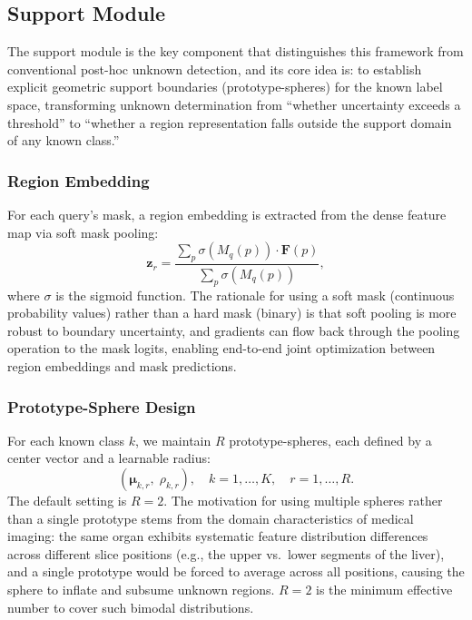 \documentclass[3p,twocolumn,authoryear]{elsarticle}
\newcommand{\bF}{\mathbf{F}}                              %
\newcommand{\bz}{\mathbf{z}}                              %
\newcommand{\bmu}{\boldsymbol{\mu}}                       %
\begin{document}
\subsection{Support Module}\label{sec:method:support}

The support module is the key component that distinguishes this framework from
conventional post-hoc unknown detection, and its core idea is:
to establish explicit geometric support boundaries (prototype-spheres) for the known
label space, transforming unknown determination from ``whether uncertainty exceeds a
threshold'' to ``whether a region representation falls outside the support domain of
any known class.''

\subsubsection{Region Embedding}\label{sec:method:support:embed}

For each query's mask, a region embedding is extracted from the dense feature map
via soft mask pooling:
\begin{equation}\label{eq:mask_pool}
  \bz_r = \frac{\sum_{p} \sigma\!\left(M_q(p)\right) \cdot \bF(p)}{\sum_{p} \sigma\!\left(M_q(p)\right)},
\end{equation}
where $\sigma$ is the sigmoid function.
The rationale for using a soft mask (continuous probability values) rather than a
hard mask (binary) is that soft pooling is more robust to boundary uncertainty,
and gradients can flow back through the pooling operation to the mask logits,
enabling end-to-end joint optimization between region embeddings and mask predictions.

\subsubsection{Prototype-Sphere Design}\label{sec:method:support:sphere}

For each known class $k$, we maintain $R$ prototype-spheres, each defined by a
center vector and a learnable radius:
\begin{equation}\label{eq:proto_sphere}
  (\bmu_{k,r},\; \rho_{k,r}), \quad k = 1, \ldots, K, \quad r = 1, \ldots, R.
\end{equation}
The default setting is $R=2$.
The motivation for using multiple spheres rather than a single prototype stems from
the domain characteristics of medical imaging: the same organ exhibits systematic
feature distribution differences across different slice positions (e.g., the upper
vs.\ lower segments of the liver), and a single prototype would be forced to average
across all positions, causing the sphere to inflate and subsume unknown regions.
$R=2$ is the minimum effective number to cover such bimodal distributions.
\end{document}
